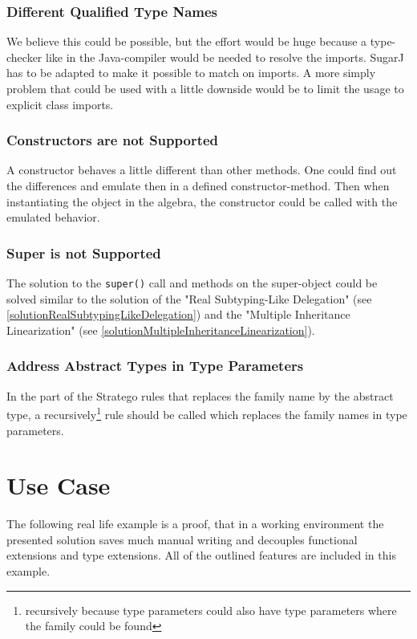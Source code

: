 \documentclass{report}
\begin{document}
\subsection{Different Qualified Type Names}

We believe this could be possible, but the effort would be huge because a type-checker like in the Java-compiler would be needed to resolve the imports. SugarJ has to be adapted to make it possible to match on imports. A more simply problem that could be used with a little downside would be to limit the usage to explicit class imports.

\subsection{Constructors are not Supported}

A constructor behaves a little different than other methods. One could find out the differences and emulate then in a defined constructor-method. Then when instantiating the object in the algebra, the constructor could be called with the emulated behavior.

\subsection{Super is not Supported}

The solution to the \lstinline{super()} call and methods on the super-object could be solved similar to the solution of the "Real Subtyping-Like Delegation" (see \ref{solutionRealSubtypingLikeDelegation}) and the "Multiple Inheritance Linearization" (see \ref{solutionMultipleInheritanceLinearization}).

\subsection{Address Abstract Types in Type Parameters}

In the part of the Stratego rules that replaces the family name by the abstract type, a recursively\footnote{recursively because type parameters could also have type parameters where the family could be found} rule should be called which replaces the family names in type parameters.


\chapter{Use Case}

The following real life example is a proof, that in a working environment the presented solution saves much manual writing and decouples functional extensions and type extensions. All of the outlined features are included in this example.
\end{document}
